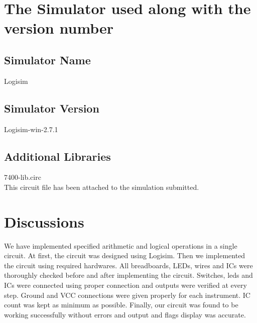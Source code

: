 \documentclass[12pt]{article}
\begin{document}
\section{The Simulator used along with the version number}

\subsection{Simulator Name}

Logisim

\subsection{Simulator Version}

Logisim-win-2.7.1

\subsection{Additional Libraries}

7400-lib.circ \\

This circuit file has been attached to the simulation submitted.

\section{Discussions}

We have implemented specified arithmetic and logical operations in a single circuit. At first, the circuit was designed using Logisim. Then we implemented the circuit using required hardwares. All breadboards, LEDs, wires and ICs were thoroughly checked before and after implementing the circuit. Switches, leds and ICs were connected using proper connection and outputs were verified at every step. Ground and VCC connections were given properly for each instrument. IC count was kept as minimum as possible. Finally, our circuit was found to be working successfully without errors and output and flags display was accurate.
\end{document}
